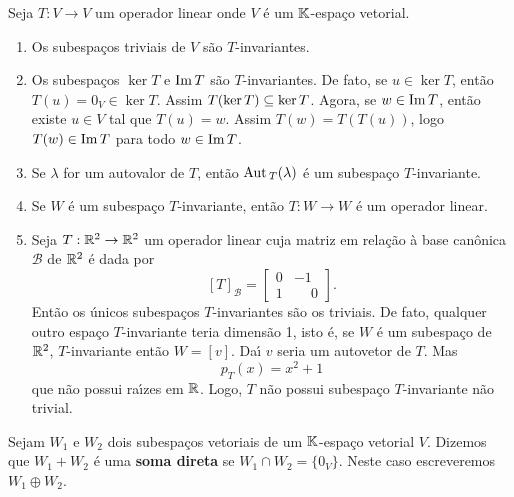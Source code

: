 \begin{exemplo}
Seja $T : V \to V$ um operador linear onde $V$ \'e um $\mathbb{K}$-espa\c{c}o vetorial.
	\begin{enumerate}[label={\arabic*})]
		\item Os subespa\c{c}os triviais de $V$ s\~ao $T$-invariantes.
		\item Os subespa\c{c}os $\ker T$ e ${\rm Im\,} T$ s\~ao $T$-invariantes. De fato, se $u \in \ker T$, ent\~ao $T(u) = 0_V \in \ker T$. Assim $T(\ker T) \subseteq \ker T$. Agora, se $w \in {\rm Im\,} T$, ent\~ao existe $u \in V$ tal que $T(u) = w$. Assim $T(w) = T(T(u))$, logo $T(w) \in {\rm Im\,} T$ para todo $w \in {\rm Im\,} T$.
		\item Se $\lambda$ for um autovalor de $T$, ent\~ao ${\rm Aut\,}_T(\lambda)$ \'e um subespa\c{c}o $T$-invariante.
		\item Se $W$ \'e um subespa\c{c}o $T$-invariante, ent\~ao $T : W \to W$ \'e um operador linear.
		\item Seja $T : \mathbb{R}^2 \to \mathbb{R}^2$ um operador linear cuja matriz em rela\c{c}\~ao \`a base can\^onica $\mathcal{B}$ de $\mathbb{R}^2$ \'e dada por
		\[
			[T]_\mathcal{B} = \begin{bmatrix}
				0 & -1\\
				1 & \phantom{-}0
			\end{bmatrix}.
		\]
		Ent\~ao os \'unicos subespa\c{c}os $T$-invariantes s\~ao os triviais. De fato, qualquer outro espa\c{c}o $T$-invariante teria dimens\~ao 1, isto \'e, se $W$ \'e um subespa\c{c}o de $\mathbb{R}^2$, $T$-invariante ent\~ao $W = [v]$. Da{\'\i} $v$ seria um autovetor de $T$. Mas
		\[
			p_T(x) = x^2 + 1
		\]
		que n\~ao possui ra{\'\i}zes em $\mathbb{R}$. Logo, $T$ n\~ao possui subespa\c{c}o $T$-invariante n\~ao trivial.
	\end{enumerate}
\end{exemplo}

\begin{definicao}
	Sejam $W_1$ e $W_2$ dois subespa\c{c}os vetoriais de um $\mathbb{K}$-espa\c{c}o vetorial $V$. Dizemos que $W_1 + W_2$ \'e uma \textbf{soma direta} se $W_1 \cap W_2 = \{0_V\}$. Neste caso escreveremos $W_1 \oplus W_2$.
\end{definicao}


